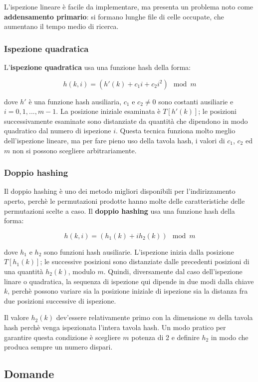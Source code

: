 L'ispezione lineare è facile da implementare, ma presenta un problema noto come \textbf{addensamento primario}: si formano lunghe file di celle occupate, che aumentano il tempo medio di ricerca.

\subsubsection{Ispezione quadratica}

L'\textbf{ispezione quadratica} usa una funzione hash della forma:

$$h(k,i)=(h'(k)+c_1i+c_2i^2)\mod m$$

dove $h'$ è una funzione hash ausiliaria, $c_1$ e $c_2\neq 0$ sono costanti ausiliarie e $i=0,1,...,m-1$. La posizione iniziale esaminata è $T[h'(k)]$; le posizioni successivamente esaminate sono distanziate da quantità che dipendono in modo quadratico dal numero di ispezione $i$. Questa tecnica funziona molto meglio dell'ispezione lineare, ma per fare pieno uso della tavola hash, i valori di $c_1$, $c_2$ ed $m$ non si possono scegliere arbitrariamente.

\subsubsection{Doppio hashing}

Il doppio hashing è uno dei metodo migliori disponibili per l'indirizzamento aperto, perchè le permutazioni prodotte hanno molte delle caratteristiche delle permutazioni scelte a caso. Il \textbf{doppio hashing} usa una funzione hash della forma:

$$h(k,i)=(h_1(k)+ih_2(k))\mod m$$

dove $h_1$ e $h_2$ sono funzioni hash ausiliarie. L'ispezione inizia dalla posizione $T[h_1(k)]$; le successive posizioni sono distanziate dalle precedenti posizioni di una quantità $h_2(k)$, modulo $m$. Quindi, diversamente dal caso dell'ispezione linare o quadratica, la sequenza di ispezione qui dipende in due modi dalla chiave $k$, perchè possono variare sia la posizione iniziale di ispezione sia la distanza fra due posizioni successive di ispezione.

Il valore $h_2(k)$ dev'essere relativamente primo con la dimensione $m$ della tavola hash perchè venga ispezionata l'intera tavola hash. Un modo pratico per garantire questa condizione è scegliere $m$ potenza di 2 e definire $h_2$ in modo che produca sempre un numero dispari.

\subsection{Domande}

